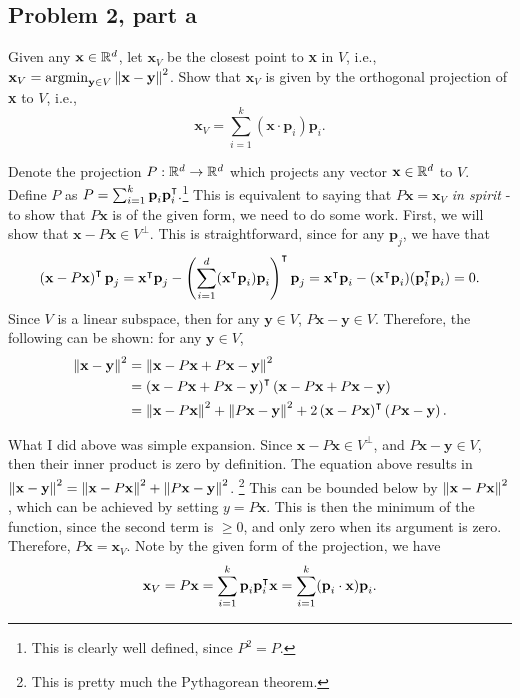 \subsection{Problem 2, part a}
Given any $\textbf{x} \in \mathbb{R}^d$, let $\textbf{x}_V$ be the closest point to \textbf{x} in $V$, i.e., $\textbf{x}_V = \operatorname*{argmin}_{\textbf{y} \in V}\norm{\textbf{x} - \textbf{y}}^2$. Show that $\textbf{x}_V$ is given by the orthogonal projection of \textbf{x} to $V$, i.e.,
\[\textbf{x}_V = \sum_{i = 1}^k (\textbf{x}\cdot \textbf{p}_i) \textbf{p}_i.\]
\partbreak
\begin{solution}

    Denote the projection $P : \mathbb{R}^d \to \mathbb{R}^d$ which projects any vector $\textbf{x}\in \mathbb{R}^d$ to $V$. Define $P$ as $P = \sum_{i = 1}^k \textbf{p}_i \textbf{p}_i^{\intercal}.$\footnote{This is clearly well defined, since $P^2 = P$.} This is equivalent to saying that $P\textbf{x} = \textbf{x}_V$ \textit{in spirit} - to show that $P\textbf{x}$ is of the given form, we need to do some work. First, we will show that $\textbf{x} - P\textbf{x} \in V^\perp$. This is straightforward, since for any $\textbf{p}_j$, we have that 
    \[\left(\textbf{x} - P\textbf{x}\right)^{\intercal} \textbf{p}_j = \textbf{x}^{\intercal} \textbf{p}_j - \left( \sum_{i = 1}^d (\textbf{x}^{\intercal} \textbf{p}_i) \textbf{p}_i\right)^{\intercal} \textbf{p}_j = \textbf{x}^{\intercal} \textbf{p}_i - (\textbf{x}^{\intercal}\textbf{p}_i)(\textbf{p}_i^{\intercal}\textbf{p}_i) = 0.\]
    Since $V$ is a linear subspace, then for any $\textbf{y} \in V$, $P\textbf{x} - \textbf{y} \in V$. Therefore, the following can be shown: for any $\textbf{y} \in V$,
    \begin{align*}
        \norm{\textbf{x} - \textbf{y}}^2 &= \norm{\textbf{x} - P\textbf{x} + P\textbf{x} - \textbf{y}}^2\\
        &=\left( \textbf{x} - P\textbf{x} + P\textbf{x} - \textbf{y}\right)^{\intercal}\left(\textbf{x} - P\textbf{x} + P\textbf{x} - \textbf{y}\right)\\
        &= \norm{\textbf{x} - P\textbf{x}}^2 + \norm{P\textbf{x} - \textbf{y}}^2 + 2\left(\textbf{x} - P\textbf{x}\right)^{\intercal}\left(P\textbf{x} - \textbf{y}\right). 
    \end{align*}

    What I did above was simple expansion. Since $\textbf{x} - P\textbf{x} \in V^\perp$, and $P\textbf{x} - \textbf{y} \in V$, then their inner product is zero by definition. The equation above results in $\norm{\textbf{x} - \textbf{y}}^2 = \norm{\textbf{x} - P\textbf{x}}^2 + \norm{P\textbf{x} - \textbf{y}}^2$. \footnote{This is pretty much the Pythagorean theorem.} This can be bounded below by $\norm{\textbf{x} - P\textbf{x}}^2$, which can be achieved by setting $y = P\textbf{x}$. This is then the minimum of the function, since the second term is $\geq 0$, and only zero when its argument is zero. Therefore, $P\textbf{x} = \textbf{x}_V$. Note by the given form of the projection, we have 
    \[\textbf{x}_V = P\textbf{x} = \sum_{i = 1}^k \textbf{p}_i\textbf{p}_i^{\intercal} \textbf{x} = \sum_{i = 1}^k (\textbf{p}_i \cdot \textbf{x})\textbf{p}_i.\]
    
\end{solution}

